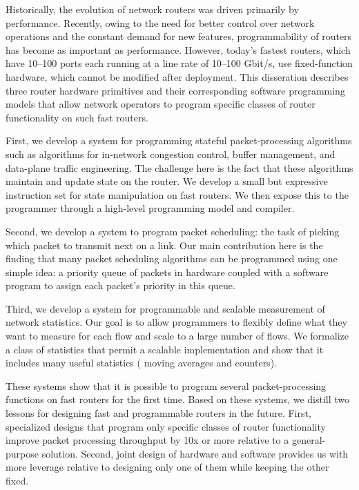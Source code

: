 % 
% 
%
Historically, the evolution of network routers was driven primarily by
performance. Recently, owing to the need for better control over network
operations and the constant demand for new features, programmability of routers
has become as important as performance.  However, today's fastest routers,
which have 10--100 ports each running at a line rate of 10--100 Gbit/s, use
fixed-function hardware, which cannot be modified after deployment. This
disseration describes three router hardware primitives and their
corresponding software programming models that allow network operators to
program specific classes of router functionality on such fast routers.

First, we develop a system for programming stateful packet-processing
algorithms such as algorithms for in-network congestion control, buffer
management, and data-plane traffic engineering. The challenge here is the fact
that these algorithms maintain and update state on the router.  We develop a
small but expressive instruction set for state manipulation on fast routers.
 We then expose this to the programmer through a high-level programming model
and compiler.

Second, we develop a system to program packet scheduling: the task of picking
which packet to transmit next on a link. Our main contribution here is the
finding that many packet scheduling algorithms can be programmed using one
simple idea: a priority queue of packets in hardware coupled with a software
program to assign each packet's priority in this queue.

Third, we develop a system for programmable and scalable measurement of network
statistics. Our goal is to allow programmers to flexibly define what they want
to measure for each flow and scale to a large number of flows. We formalize
a class of statistics that permit a scalable
implementation and show that it includes many useful statistics (\eg
moving averages and counters).

These systems show that it is possible to program several packet-processing
functions on fast routers for the first time. Based on these systems, we
distill two lessons for designing fast and programmable routers in the future.
First, specialized designs that program only specific classes of router
functionality improve packet processing throughput by 10x or more relative to a general-purpose
solution. Second, joint design of
hardware and software provides us with more leverage relative to designing only
one of them while keeping the other fixed.
